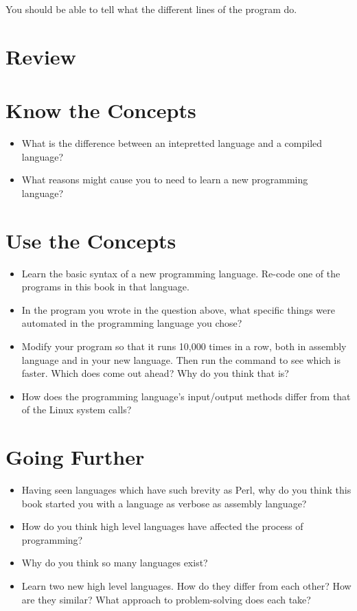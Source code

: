 \begin{simpletyping}

\end{simpletyping}

You should be able to tell what the different lines of the program do.

\section{Review}

\section{Know the Concepts}

\begin{itemize}\item What is the difference between an intepretted language and a compiled language? 
\item What reasons might cause you to need to learn a new programming language? 
\end{itemize}

\section{Use the Concepts}

\begin{itemize}\item Learn the basic syntax of a new programming language.  Re-code one of the programs in this book in that language. 
\item In the program you wrote in the question above, what specific things were automated in the programming language you chose? 
\item Modify your program so that it runs 10,000 times in a row, both in assembly language and in your new language.  Then run the  command to see which is faster.  Which does come out ahead?  Why do you think that is? 
\item How does the programming language's input/output methods differ from that of the Linux system calls? 
\end{itemize}

\section{Going Further}

\begin{itemize}\item Having seen languages which have such brevity as Perl, why do you think this book started you with a language as verbose as assembly language? 
\item How do you think high level languages have affected the process of programming? 
\item Why do you think so many languages exist? 
\item Learn two new high level languages.  How do they differ from each other?  How are they similar?  What approach to problem-solving does each take? 
\end{itemize}

